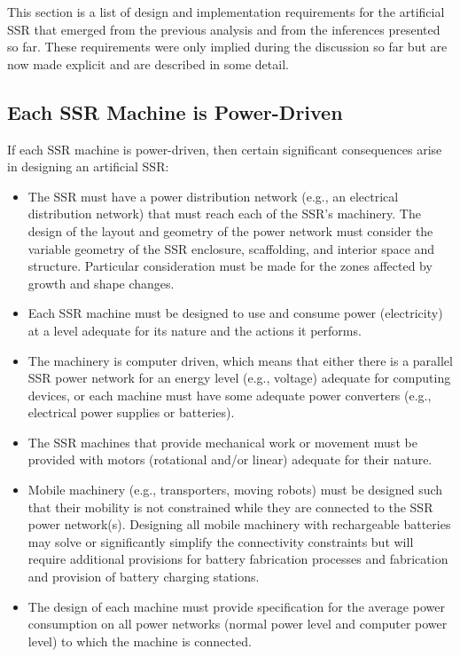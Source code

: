 This section is a list of design and implementation
requirements for the artificial SSR that emerged from the previous
analysis and from the inferences presented so far. These requirements
were only implied during the discussion so far but are now made
explicit and are described in some detail.

\subsection[Each SSR Machine is Power{}-Driven]{Each SSR Machine is Power-Driven}

If each SSR machine is power-driven, then certain significant consequences arise in designing an artificial SSR:

\begin{itemize}
\item The SSR must have a power distribution network (e.g., an electrical
distribution network) that must reach each of the SSR's machinery. The
design of the layout and geometry of the power network must consider
the variable geometry of the SSR enclosure, scaffolding, and 
interior space and structure. Particular consideration must be made for the zones affected by
growth and shape changes.
\item Each SSR machine must be designed to use and consume power
(electricity) at a level adequate for its nature and the actions it
performs. 
\item The machinery is computer driven, which means that either
there is a parallel SSR power network for an energy level (e.g., voltage)
adequate for computing devices, or each machine must have some adequate
power converters (e.g., electrical power supplies or batteries).
\item The SSR machines that provide mechanical work or movement must be
provided with motors (rotational and/or linear) adequate for their nature.
\item Mobile machinery (e.g., transporters, moving robots) must be designed
such that their mobility is not constrained while they
are connected to the SSR power network(s).  Designing all mobile
machinery with rechargeable batteries may solve or significantly
simplify the connectivity constraints but will require additional
provisions for battery fabrication processes and fabrication and
provision of battery charging stations.
\item The design of each machine must provide specification for the average
power consumption on all power networks (normal power level and
computer power level) to which the machine is connected.
\end{itemize}

